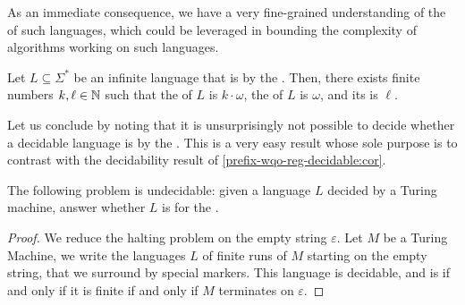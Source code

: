 As an immediate consequence, we have a very fine-grained understanding of the
 of such  languages, which could be
leveraged in bounding the complexity of algorithms working on such languages.

\begin{corollary}
    Let $L \subseteq \Sigma^*$ be an infinite language that is  by
    the . Then, there exists finite numbers $k,\ell \in \mathbb{N}$ such that
    the
     of $L$ is $k \cdot \omega$,
    the  of $L$ is $\omega$, and its
     is $\ell$.
\end{corollary}

Let us conclude by noting that it is unsurprisingly not possible to decide
whether a decidable language is  by the . This is a very easy result whose sole purpose is to contrast with
the decidability result of \cref{prefix-wqo-reg-decidable:cor}.

\begin{lemma}
    The following problem is undecidable: given a language $L$
    decided by a Turing machine, answer whether 
    $L$ is  for the .
\end{lemma}
\begin{proof}
    We reduce the halting problem on the empty string $\varepsilon$.
    Let $M$ be a Turing Machine, we write the languages $L$ of finite runs
    of $M$ starting on the empty string,
    that we surround by special markers. This language is decidable,
    and 
    is
     if and only if it is finite
    if and only if $M$ terminates on $\varepsilon$.
\end{proof}
